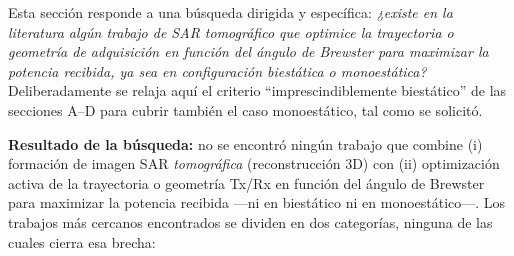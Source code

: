 \documentclass[11pt,a4paper]{article}
\begin{document}
Esta sección responde a una búsqueda dirigida y específica: \emph{¿existe en
la literatura algún trabajo de SAR tomográfico que optimice la trayectoria
o geometría de adquisición en función del ángulo de Brewster para maximizar
la potencia recibida, ya sea en configuración biestática o monoestática?}
Deliberadamente se relaja aquí el criterio ``imprescindiblemente biestático''
de las secciones A--D para cubrir también el caso monoestático, tal como se
solicitó.

\textbf{Resultado de la búsqueda:} no se encontró ningún trabajo que combine
(i) formación de imagen SAR \emph{tomográfica} (reconstrucción 3D) con (ii)
optimización activa de la trayectoria o geometría Tx/Rx en función del
ángulo de Brewster para maximizar la potencia recibida —ni en biestático ni
en monoestático—. Los trabajos más cercanos encontrados se dividen en dos
categorías, ninguna de las cuales cierra esa brecha:
\end{document}
